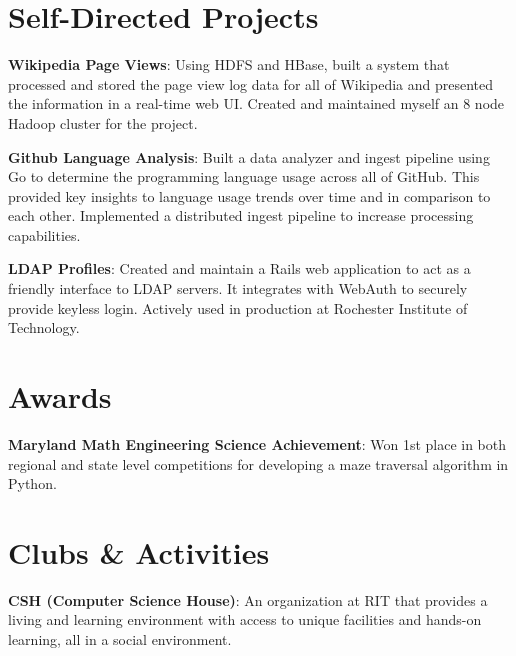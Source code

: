 \documentclass[a4paper,margin,line]{resume}
\begin{document}
\begin{resume}
\section{\mysidestyle Self-Directed Projects}
    \begin{asparablank}
        \item \textbf{Wikipedia Page Views}: Using HDFS and HBase, built a system that
            processed and stored the page view log data for all of Wikipedia 
            and presented the information in a real-time web UI. Created and 
            maintained myself an 8 node Hadoop cluster for the project. \\
        \item \textbf{Github Language Analysis}: Built a data analyzer and
            ingest pipeline using Go to determine the programming language 
            usage across all of GitHub. This provided key insights to language usage
            trends over time and in comparison to each other. Implemented a 
            distributed ingest pipeline to increase processing capabilities. \\
        \item \textbf{LDAP Profiles}: Created and maintain a Rails web 
            application to act as a friendly interface to LDAP servers. 
            It integrates with WebAuth to securely provide keyless login. 
            Actively used in production at Rochester Institute of Technology. \\
    \end{asparablank}
\section{\mysidestyle Awards}
    \begin{asparablank}
        \item \textbf{Maryland Math Engineering Science Achievement}: Won 1st place
            in both regional and state level competitions for developing a maze
            traversal algorithm in Python. 
    \end{asparablank}
\section{\mysidestyle Clubs \& Activities}
    \begin{asparablank}
        \item \textbf{CSH (Computer Science House)}: An organization at RIT that
            provides a living and learning environment with access to unique facilities
            and hands-on learning, all in a social environment.
    \end{asparablank}
\end{resume}
\end{document}
